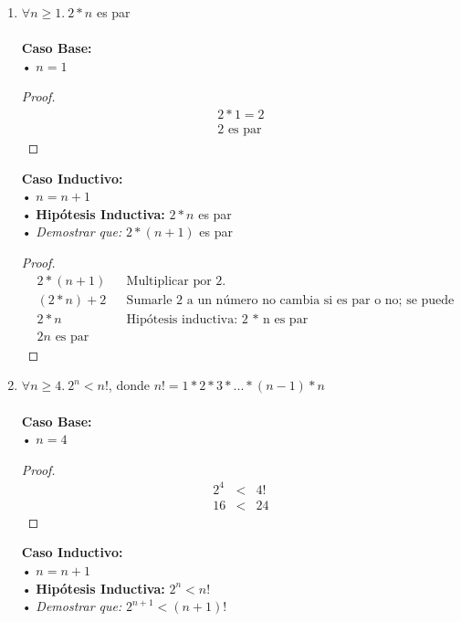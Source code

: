 \documentclass[11pt,letterpaper]{article}
\begin{document}
\begin{enumerate}
\item $\forall n \geq 1. \ 2 * n$ es par
\\\\
\noindent \textbf{\large Caso Base:} \\
\noindent • $n=1$
\begin{proof}
\begin{eqnarray}
2 * 1 = 2 \\
2 \text{ es par}
\end{eqnarray}
\end{proof}

\vspace{0.1cm}

\noindent \textbf{\large Caso Inductivo:}\\
\noindent • $n=n+1$ \\
\noindent • \textbf{Hipótesis Inductiva: } $2 * n$ es par \\
\noindent • \emph{Demostrar que:} $2 * (n + 1)$ es par

\begin{proof}
\begin{align}
&2 * (n+1) && \text{Multiplicar por $2$.} \\
&(2*n) + 2 && \text{Sumarle 2 a un número no cambia si es par o no; se puede omitir.} \\
&2*n && \text{Hipótesis inductiva: 2 * n es par} \\
&2n \text{ es par}
\end{align}
\end{proof}


\item $\forall n \geq 4. \ 2^n < n!$, donde $n! = 1 * 2 * 3 * ... * (n-1) * n$
\\\\
\noindent \textbf{\large Caso Base:} \\
\noindent • $n=4$
\begin{proof}
\begin{eqnarray}
2^4 &<& 4! \\
16 &<& 24
\end{eqnarray}
\end{proof}

\vspace{0.1cm}

\noindent \textbf{\large Caso Inductivo:}\\
\noindent • $n=n+1$ \\
\noindent • \textbf{Hipótesis Inductiva: } $2^n < n!$ \\
\noindent • \emph{Demostrar que:} $2^{n+1} < (n+1)!$


\end{enumerate}
\end{document}
